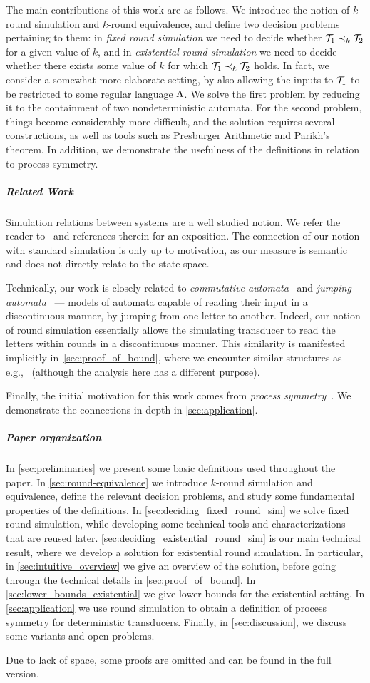 The main contributions of this work are as follows. We introduce the notion of $k$-round simulation and $k$-round equivalence, and define two decision problems pertaining to them: in \emph{fixed round simulation} we need to decide whether $\mathcal{T}_1\prec_k \mathcal{T}_2$ for a given value of $k$, and in \emph{existential round simulation} we need to decide whether there exists some value of $k$ for which $\mathcal{T}_1\prec_k \mathcal{T}_2$ holds. In fact, we consider a somewhat more elaborate setting, by also allowing the inputs to $\mathcal{T}_1$ to be restricted to some regular language $\Lambda$.
We solve the first problem by reducing it to the containment of two nondeterministic automata. For the second problem, things become considerably more difficult, and the solution requires several constructions, as well as tools such as Presburger Arithmetic and Parikh's theorem. 
In addition, we demonstrate the usefulness of the definitions in relation to process symmetry.

\subparagraph*{Related Work} Simulation relations between systems are a well studied notion. We refer the reader to~\cite[Chapter 13]{Clarke2018a} and references therein for an exposition. The connection of our notion with standard simulation is only up to motivation, as our measure is semantic and does not directly relate to the state space.

Technically, our work is closely related to \emph{commutative automata}~\cite{Brzozowski1973} and \emph{jumping automata}~\cite{Fernau2015,Meduna2012} --- models of automata capable of reading their input in a discontinuous manner, by jumping from one letter to another. Indeed, our notion of round simulation essentially allows the simulating transducer to read the letters within rounds in a discontinuous manner. This similarity is manifested implicitly in~\autoref{sec:proof_of_bound}, where we encounter similar structures as e.g.,~\cite{Hoffmann2020} (although the analysis here has a different purpose).

Finally, the initial motivation for this work comes from \emph{process symmetry}~\cite{Almagor2020b,Clarke1996,Emerson1996,Ip1996,Lin2016}. We demonstrate the connections in depth in \autoref{sec:application}.

\subparagraph*{Paper organization}
In \autoref{sec:preliminaries} we present some basic definitions used throughout the paper. In \autoref{sec:round-equivalence} we introduce $k$-round simulation and equivalence, define the relevant decision problems, and study some fundamental properties of the definitions. In \autoref{sec:deciding_fixed_round_sim} we solve fixed round simulation, while developing some technical tools and characterizations that are reused later. \autoref{sec:deciding_existential_round_sim} is our main technical result, where we develop a solution for existential round simulation. In particular, in \autoref{sec:intuitive_overview} we give an overview of the solution, before going through the technical details in \autoref{sec:proof_of_bound}. In \autoref{sec:lower_bounds_existential} we give lower bounds for the existential setting.
In \autoref{sec:application} we use round simulation to obtain a definition of process symmetry for deterministic transducers. Finally, in \autoref{sec:discussion}, we discuss some variants and open problems.

Due to lack of space, some proofs are omitted and can be found in the full version.

